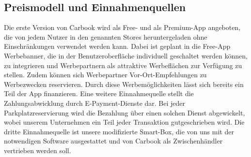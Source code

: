 \documentclass[12pt,ngerman, fleqn]{book} %
\begin{document}
\subsection{Preismodell und Einnahmenquellen}
Die erste Version von Carbook wird als Free- und als Premium-App angeboten, die von jedem Nutzer in den genannten Stores heruntergeladen ohne Einschränkungen verwendet werden kann.
Dabei ist geplant in die Free-App Werbebanner, die in der Benutzeroberfläche individuell geschaltet werden können, zu integrieren und Werbepartnern als attraktive Werbeflächen zur Verfügung zu stellen. Zudem können sich Werbepartner Vor-Ort-Empfehlungen zu Werbezwecken reservieren. Durch diese Werbemöglichkeiten lässt sich bereits ein Teil der App finanzieren.
Eine weitere Einnahmequelle stellt die Zahlungsabwicklung durch E-Payment-Dienste dar. Bei jeder Parkplatzreservierung wird die Bezahlung über einen solchen Dienst abgewickelt, wobei unserem Unternehmen ein Teil jeder Transaktion gutgeschrieben wird.
Die dritte Einnahmequelle ist unsere modifizierte Smart-Box, die von uns mit der notwendigen Software ausgestattet und von Carbook als Zwischenhändler vertrieben werden soll.
\end{document}
